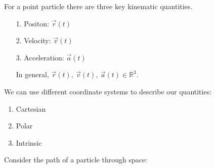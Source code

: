 \documentclass[twoside]{scrartcl}
\begin{document}
  

{}

For a point particle there are three key kinematic quantities.\begin{enumerate}
\item[1.] Positon: $\vec{r}(t)$
\item[2.] Velocity: $\vec{v}(t)$
\item[3.] Acceleration: $\vec{a}(t)$

In general, $\vec{r}(t),~\vec{v}(t),~\vec{a}(t) \in \mathbb{R}^3$. 
\end{enumerate}\vspace*{5pt}

We can use different coordinate systems to describe our quantities:
\begin{enumerate}
\item Cartesian
\item Polar
\item Intrinsic	
\end{enumerate}


Consider the path of a particle through space:
\end{document}
